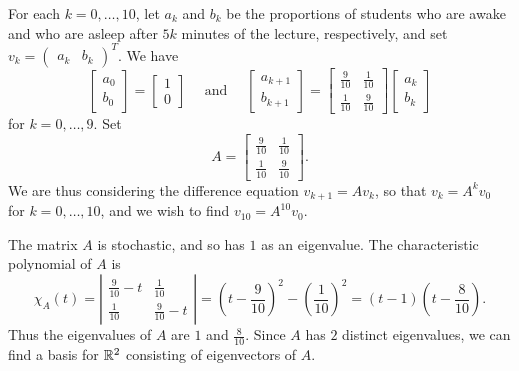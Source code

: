 \documentclass[a4paper]{amsart}
\renewenvironment{solution}{\SolutionInline}{\endSolutionInline}
\begin{document}
\begin{solution}
 For each $k = 0, \ldots, 10$, let $a_k$ and $b_k$ be the
 proportions of students who are awake and who are asleep after
 $5k$ minutes of the lecture, respectively, and set $v_k
 =(\begin{array}{cc} a_k & b_k \end{array})^T$. We have
     $$
     \left[\begin{array}{cc} a_0\\ b_0 \end{array}\right]
     =\left[\begin{array}{cc} 1\\ 0 \end{array}\right]
    \quad \text{~and~} \quad \left[\begin{array}{cc} a_{k+1}\\ b_{k+1}
    \end{array}\right]=
     \left[\begin{array}{cc} \frac{9}{10} & \frac{1}{10}\\[3pt]
     \frac{1}{10} & \frac{9}{10}
     \end{array}\right] \left[\begin{array}{cc} a_k\\ b_k \end{array}\right] $$
 for $k = 0, \ldots, 9$. Set
 $$ A =
       \left[\begin{array}{cc} \frac{9}{10} & \frac{1}{10}\\[3pt]
     \frac{1}{10} & \frac{9}{10}
     \end{array}\right].$$
 We are thus considering the difference equation $v_{k+1} = Av_k$, so
 that $v_k =
 A^kv_0$ for $k = 0, \ldots, 10$, and we wish to find $v_{10} = A^{10}v_0$.

 The matrix $A$ is stochastic, and so has $1$ as an eigenvalue. The characteristic polynomial of $A$ is
 $$
 \chi_A(t) = \left| \begin{array}{cc} \frac{9}{10} - t & \frac{1}{10}\\[3pt] \frac{1}{10}
 & \frac{9}{10} - t \end{array} \right| =
 {\textstyle \left(t - \frac{9}{10}\right)^2 -
 \left(\frac{1}{10}\right)^2 = (t - 1)\left( t - \frac{8}{10}\right)}.
 $$
 Thus the eigenvalues of $A$ are $1$ and $\frac{8}{10}$. Since $A$ has $2$ distinct
 eigenvalues, we can find a basis for ${\mathbb{R}}^2$ consisting of
 eigenvectors of $A$.


\end{solution}
\end{document}
